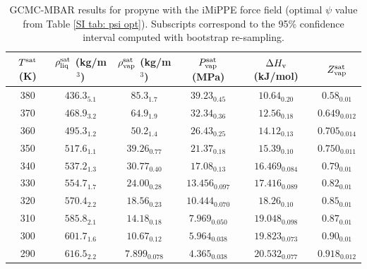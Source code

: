\documentclass[journal=jctc,manuscript=article]{achemso}
\begin{document}
\begin{table}[htb!]
	\caption{GCMC-MBAR results for propyne with the iMiPPE force field (optimal $\psi$ value from Table \ref{SI tab: psi opt}). Subscripts correspond to the 95\% confidence interval computed with bootstrap re-sampling.}
	\begin{center}
		\begin{tabular}{|c|c|c|c|c|c|}
			\hline
			$T^{\rm sat}$ (K) & $\rho_{\rm liq}^{\rm sat}$ (kg/m$^3$) & $\rho_{\rm vap}^{\rm sat}$ (kg/m$^3$) & $P_{\rm vap}^{\rm sat}$ (MPa) & $\Delta H_{\rm v}$ (kJ/mol) & $Z_{\rm vap}^{\rm sat}$ \\ \hline
			380 & $436.3_{5.1}$ & $85.3_{1.7}$ & $39.23_{0.45}$ & $10.64_{0.20}$ & $0.58_{0.01}$ \\
			370 & $468.9_{3.2}$ & $64.9_{1.9}$ & $32.34_{0.36}$ & $12.56_{0.18}$ & $0.649_{0.012}$ \\
			360 & $495.3_{1.2}$ & $50.2_{1.4}$ & $26.43_{0.25}$ & $14.12_{0.13}$ & $0.705_{0.014}$ \\
			350 & $517.6_{1.1}$ & $39.26_{0.77}$ & $21.37_{0.18}$ & $15.39_{0.10}$ & $0.750_{0.011}$ \\
			340 & $537.2_{1.3}$ & $30.77_{0.40}$ & $17.08_{0.13}$ & $16.469_{0.084}$ & $0.79_{0.01}$ \\
			330 & $554.7_{1.7}$ & $24.00_{0.28}$ & $13.456_{0.097}$ & $17.416_{0.089}$ & $0.82_{0.01}$ \\
			320 & $570.4_{2.2}$ & $18.56_{0.23}$ & $10.444_{0.070}$ & $18.26_{0.10}$ & $0.85_{0.01}$ \\
			310 & $585.8_{2.1}$ & $14.18_{0.18}$ & $7.969_{0.050}$ & $19.048_{0.098}$ & $0.87_{0.01}$ \\
			300 & $601.7_{1.6}$ & $10.67_{0.12}$ & $5.964_{0.038}$ & $19.823_{0.073}$ & $0.90_{0.01}$ \\
			290 & $616.5_{2.2}$ & $7.899_{0.078}$ & $4.365_{0.038}$ & $20.532_{0.077}$ & $0.918_{0.012}$ \\
			\hline
		\end{tabular}
	\end{center}
\end{table}
\end{document}

